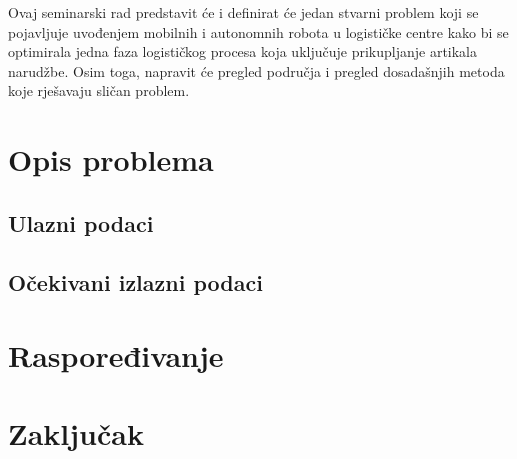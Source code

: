 \documentclass[times, utf8, seminar]{fer}
\begin{document}
\pagebreak

Ovaj seminarski rad predstavit će i definirat će jedan stvarni problem koji
se pojavljuje uvođenjem mobilnih i autonomnih robota u logističke centre kako bi se
optimirala jedna faza logističkog procesa koja uključuje prikupljanje
artikala narudžbe. Osim toga, napravit će pregled područja i pregled dosadašnjih
metoda koje rješavaju sličan problem.

\chapter{Opis problema}
\section{Ulazni podaci}
\section{Očekivani izlazni podaci}

\chapter{Raspoređivanje}

\chapter{Zaključak}




\begin{sazetak}

\end{sazetak}

\begin{abstract}

\end{abstract}
\end{document}
